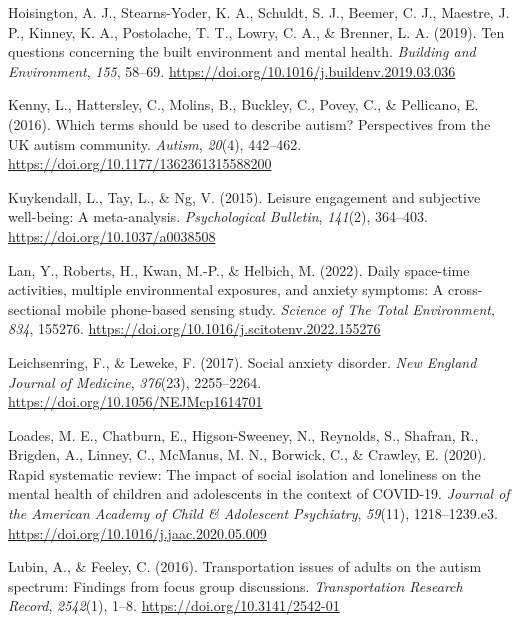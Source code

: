 \documentclass[
  letterpaper,
  number,
  review,
  3p]{elsarticle}
\newlength{\cslhangindent}
\newenvironment{CSLReferences}[2] %
 {\begin{list}{}{%
  \setlength{\itemindent}{0pt}
  \setlength{\leftmargin}{0pt}
  \setlength{\parsep}{0pt}
  \ifodd #1
   \setlength{\leftmargin}{\cslhangindent}
   \setlength{\itemindent}{-1\cslhangindent}
  \fi
  \setlength{\itemsep}{#2\baselineskip}}}
 {\end{list}}
\begin{document}
\begin{CSLReferences}{1}{0}
Hoisington, A. J., Stearns-Yoder, K. A., Schuldt, S. J., Beemer, C. J.,
Maestre, J. P., Kinney, K. A., Postolache, T. T., Lowry, C. A., \&
Brenner, L. A. (2019). Ten questions concerning the built environment
and mental health. \emph{Building and Environment}, \emph{155}, 58--69.
\url{https://doi.org/10.1016/j.buildenv.2019.03.036}

Kenny, L., Hattersley, C., Molins, B., Buckley, C., Povey, C., \&
Pellicano, E. (2016). Which terms should be used to describe autism?
{Perspectives} from the {UK} autism community. \emph{Autism},
\emph{20}(4), 442--462. \url{https://doi.org/10.1177/1362361315588200}

Kuykendall, L., Tay, L., \& Ng, V. (2015). Leisure engagement and
subjective well-being: {A} meta-analysis. \emph{Psychological Bulletin},
\emph{141}(2), 364--403. \url{https://doi.org/10.1037/a0038508}

Lan, Y., Roberts, H., Kwan, M.-P., \& Helbich, M. (2022). Daily
space-time activities, multiple environmental exposures, and anxiety
symptoms: {A} cross-sectional mobile phone-based sensing study.
\emph{Science of The Total Environment}, \emph{834}, 155276.
\url{https://doi.org/10.1016/j.scitotenv.2022.155276}

Leichsenring, F., \& Leweke, F. (2017). Social anxiety disorder.
\emph{New England Journal of Medicine}, \emph{376}(23), 2255--2264.
\url{https://doi.org/10.1056/NEJMcp1614701}

Loades, M. E., Chatburn, E., Higson-Sweeney, N., Reynolds, S., Shafran,
R., Brigden, A., Linney, C., McManus, M. N., Borwick, C., \& Crawley, E.
(2020). Rapid systematic review: {The} impact of social isolation and
loneliness on the mental health of children and adolescents in the
context of {COVID-19}. \emph{Journal of the American Academy of Child \&
Adolescent Psychiatry}, \emph{59}(11), 1218--1239.e3.
\url{https://doi.org/10.1016/j.jaac.2020.05.009}

Lubin, A., \& Feeley, C. (2016). Transportation issues of adults on the
autism spectrum: {Findings} from focus group discussions.
\emph{Transportation Research Record}, \emph{2542}(1), 1--8.
\url{https://doi.org/10.3141/2542-01}


\end{CSLReferences}
\end{document}
